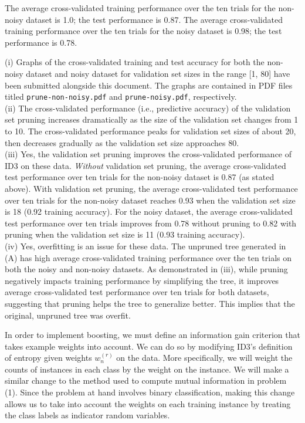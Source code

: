 \documentclass[solution, letterpaper]{cs121}
\begin{document}
\subproblem The average cross-validated training performance over the ten trials for the non-noisy dataset is 1.0; the test performance is 0.87. The average cross-validated training performance over the ten trials for the noisy dataset is 0.98; the test performance is 0.78.
\pagebreak
\subproblem
 
(i) Graphs of the cross-validated training and test accuracy for both the non-noisy dataset and noisy dataset for validation set sizes in the range [1, 80] have been submitted alongside this document. The graphs are contained in PDF files titled {\tt prune-non-noisy.pdf} and {\tt prune-noisy.pdf}, respectively. \\

(ii) The cross-validated performance (i.e., predictive accuracy) of the validation set pruning increases dramatically as the size of the validation set changes from 1 to 10. The cross-validated performance peaks for validation set sizes of about 20, then decreases gradually as the validation set size approaches 80. \\

(iii) Yes, the validation set pruning improves the cross-validated performance of ID3 on these data. \emph{Without} validation set pruning, the average cross-validated test performance over ten trials for the non-noisy dataset is 0.87 (as stated above). With validation set pruning, the average cross-validated test performance over ten trials for the non-noisy dataset reaches 0.93 when the validation set size is 18 (0.92 training accuracy). For the noisy dataset, the average cross-validated test performance over ten trials improves from 0.78 without pruning to 0.82 with pruning when the validation set size is 11 (0.93 training accuracy). \\

(iv) Yes, overfitting is an issue for these data. The unpruned tree generated in (A) has high average cross-validated training performance over the ten trials on both the noisy and non-noisy datasets. As demonstrated in (iii), while pruning negatively impacts training performance by simplifying the tree, it improves average cross-validated test performance over ten trials for both datasets, suggesting that pruning helps the tree to generalize better. This implies that the original, unpruned tree was overfit.

\subproblem In order to implement boosting, we must define an information gain criterion that takes example weights into account. We can do so by modifying ID3's definition of entropy given weights $w_n^{(r)}$ on the data. More specifically, we will weight the counts of instances in each class by the weight on the instance. We will make a similar change to the method used to compute mutual information in problem (1). Since the problem at hand involves binary classification, making this change allows us to take into account the weights on each training instance by treating the class labels as indicator random variables.
\end{document}
